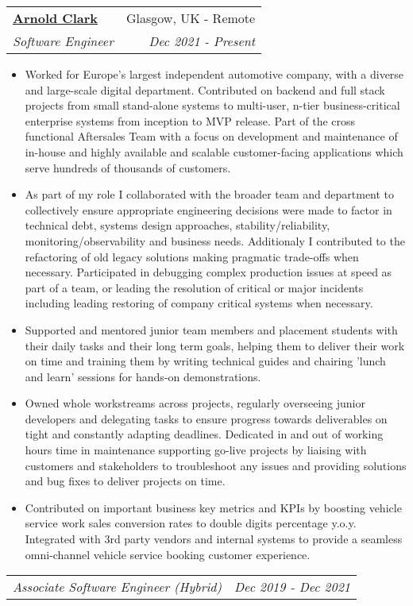 \documentclass[letterpaper,11pt]{article}
\makeatletter
\newcommand{\resumeItem}[1]{
  \item\small{
    {#1 \vspace{-1pt}}
  }
}
\newcommand{\resumeSubheading}[4]{
  \item
    \begin{tabular*}{0.97\textwidth}[t]{l@{\extracolsep{\fill}}r}
      \textbf{#1} & #2 \\
      \textit{\small#3} & \textit{\small #4} \\
    \end{tabular*}\vspace{1mm}
}
\newcommand{\resumeSubSubheading}[2]{
    \item
    \begin{tabular*}{0.97\textwidth}{l@{\extracolsep{\fill}}r}
      \textit{\small#1} & \textit{\small #2} \\
    \end{tabular*}\vspace{1mm}
}
\newcommand{\resumeItemListStart}{\begin{itemize}}
\newcommand{\resumeItemListEnd}{\end{itemize}\vspace{-5pt}}
\makeatother
\begin{document}
    \resumeSubheading
      {\href{https://www.arnoldclark.com/about-us}{Arnold Clark}}{Glasgow, UK - Remote}
      {Software Engineer}{Dec 2021 - Present}
      \resumeItemListStart
        \resumeItem{}
        {Worked for Europe's largest independent automotive company, with a diverse and large-scale digital department. Contributed on backend and full stack projects from small stand-alone systems to multi-user, n-tier business-critical enterprise systems from inception to MVP release. 
        Part of the cross functional Aftersales Team with a focus on development and maintenance of in-house and highly available and scalable customer-facing applications which serve hundreds of thousands of customers. 
        }
        \resumeItem{}
        {As part of my role I collaborated with the broader team and department to collectively ensure appropriate engineering decisions were made to factor in technical debt, systems design approaches, stability/reliability, 
        monitoring/observability and business needs. Additionaly I contributed to the refactoring of old legacy solutions making pragmatic trade-offs when necessary.
        Participated in debugging complex production issues at speed as part of a team, or leading the resolution of 
        critical or major incidents including leading restoring of company critical systems when necessary.}
        \resumeItem{}
          {Supported and mentored junior team members and placement students with their daily tasks and their long term goals, 
          helping them to deliver their work on time and training them by writing technical guides and chairing 'lunch and learn' sessions for hands-on demonstrations.}
          \resumeItem{}
           {Owned whole workstreams across projects, regularly overseeing junior developers and delegating tasks to ensure progress towards deliverables on tight and constantly adapting deadlines. Dedicated in and out of working hours time in maintenance supporting go-live projects by liaising with customers and stakeholders to troubleshoot any issues and providing solutions and bug fixes to deliver projects on
          time.}
          \resumeItem{}
           {Contributed on important business key metrics and KPIs by boosting vehicle service work sales conversion rates to double digits percentage y.o.y. Integrated with 3rd party vendors and internal systems to provide a seamless omni-channel vehicle service booking customer experience.}
          \resumeItemListEnd
          \vspace{3mm}
    \resumeSubSubheading
     {Associate Software Engineer (Hybrid)}{Dec 2019 - Dec 2021}
\end{document}
